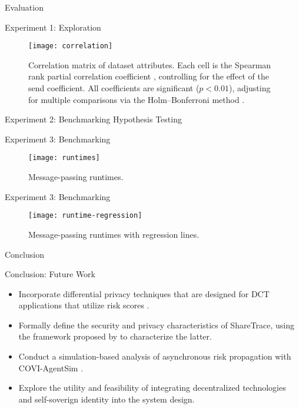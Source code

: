 \documentclass[11pt]{beamer}
\begin{document}
\begin{section}{Evaluation}
\begin{frame}{Experiment 1: Exploration}
\begin{figure}
  \centering
  \texttt{[image: correlation]}
  \caption[Correlation matrix of dataset attributes]{Correlation matrix of dataset attributes. Each cell is the Spearman rank partial correlation coefficient \citep{Spearman1904}, controlling for the effect of the send coefficient. All coefficients are significant ($p < 0.01$), adjusting for multiple comparisons via the Holm–Bonferroni method \citep{Holm1979}.}
\end{figure}
\end{frame}

\begin{frame}{Experiment 2: Benchmarking Hypothesis Testing}
\end{frame}

\begin{frame}{Experiment 3: Benchmarking}
\begin{figure}
  \centering
  \texttt{[image: runtimes]}
  \caption[Message-passing runtimes]{Message-passing runtimes.}
\end{figure}
\end{frame}

\begin{frame}{Experiment 3: Benchmarking}
\begin{figure}
  \centering
  \texttt{[image: runtime-regression]}
  \caption[Message-passing runtimes with regression lines]{Message-passing runtimes with regression lines.}
\end{figure}
\end{frame}

\end{section}

\begin{section}{Conclusion}

\begin{frame}{Conclusion: Future Work}
\begin{itemize}
  \item Incorporate differential privacy techniques that are designed for DCT applications that utilize risk scores \citep{Romijnders2024}.
  \pause
  \item Formally define the security and privacy characteristics of ShareTrace, using the framework proposed by \citet{Kuhn2021} to characterize the latter.
  \pause
  \item Conduct a simulation-based analysis of asynchronous risk propagation with COVI-AgentSim \citep{Gupta2020}.
  \pause
  \item Explore the utility and feasibility of integrating decentralized technologies \citep{Benet2014, Troncoso2017, Trautwein2022, Shi2024, Keizer2024} and self-soverign identity \citep{Preukschat2021, Schardong2022} into the system design.
\end{itemize}
\end{frame}

\end{section}
\end{document}
